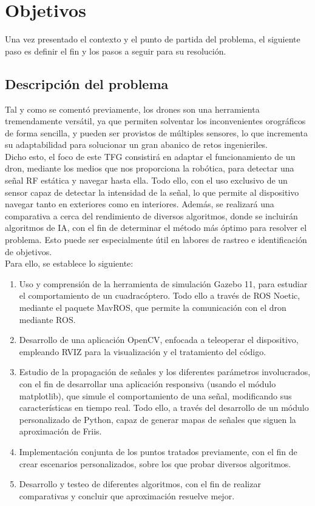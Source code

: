 \chapter{Objetivos}
\label{cap:capitulo2}

Una vez presentado el contexto y el punto de partida del problema, el siguiente paso es definir el fin y los pasos a seguir para su resolución.\\

\section{Descripción del problema}
\label{sec:descripcion_problema}

Tal y como se comentó previamente, los drones son una herramienta tremendamente versátil, ya que permiten solventar los inconvenientes orográficos de forma sencilla, y pueden ser provistos de múltiples sensores, lo que incrementa su adaptabilidad para solucionar un gran abanico de retos ingenieriles.\\

Dicho esto, el foco de este \ac{TFG} consistirá en adaptar el funcionamiento de un dron, mediante los medios que nos proporciona la robótica, para detectar una señal \ac{RF} estática y navegar hasta ella. Todo ello, con el uso exclusivo de un sensor capaz de detectar la intensidad de la señal, lo que permite al dispositivo navegar tanto en exteriores como en interiores. Además, se realizará una comparativa a cerca del rendimiento de diversos algoritmos, donde se incluirán algoritmos de \ac{IA}, con el fin de determinar el método más óptimo para resolver el problema. Esto puede ser especialmente útil en labores de rastreo e identificación de objetivos.\\

Para ello, se establece lo siguiente:

\begin{enumerate}
	\item Uso y comprensión de la herramienta de simulación Gazebo 11, para estudiar el comportamiento de un cuadracóptero. Todo ello a través de \ac{ROS} Noetic, mediante el paquete MavROS, que permite la comunicación con el dron mediante \ac{ROS}.
	\item Desarrollo de una aplicación OpenCV, enfocada a teleoperar el dispositivo, empleando RVIZ para la visualización y el tratamiento del código.
	\item Estudio de la propagación de señales y los diferentes parámetros involucrados, con el fin de desarrollar una aplicación responsiva (usando el módulo matplotlib), que simule el comportamiento de una señal, modificando sus características en tiempo real. Todo ello, a través del desarrollo de un módulo personalizado de Python, capaz de generar mapas de señales que siguen la aproximación de Friis.
	\item Implementación conjunta de los puntos tratados previamente, con el fin de crear escenarios personalizados, sobre los que probar diversos algoritmos.
	\item Desarrollo y testeo de diferentes algoritmos, con el fin de realizar comparativas y concluir que aproximación resuelve mejor.
\end{enumerate}

